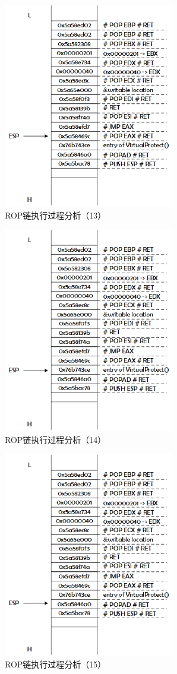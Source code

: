 \documentclass[bachelor]{thesis-uestc}
\begin{document}
\begin{figure}[htbp]
	\centering\includegraphics[height=9cm]{images/rop_chain_s13.png}
	\caption{ROP链执行过程分析（13）}
	\label{fig:rop_chain_s13}
\end{figure}

\begin{figure}[htbp]
	\centering\includegraphics[height=9cm]{images/rop_chain_s14.png}
	\caption{ROP链执行过程分析（14）}
	\label{fig:rop_chain_s14}
\end{figure}

\begin{figure}[htbp]
	\centering\includegraphics[height=9cm]{images/rop_chain_s15.png}
	\caption{ROP链执行过程分析（15）}
	\label{fig:rop_chain_s15}
\end{figure}
\end{document}
